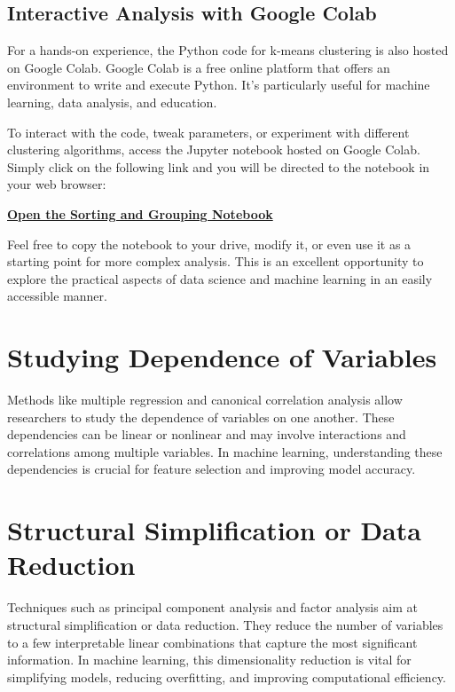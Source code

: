 \documentclass{book}
\begin{document}
\subsection{Interactive Analysis with Google Colab}
For a hands-on experience, the Python code for k-means clustering is also hosted on Google Colab. Google Colab is a free online platform that offers an environment to write and execute Python. It's particularly useful for machine learning, data analysis, and education.

To interact with the code, tweak parameters, or experiment with different clustering algorithms, access the Jupyter notebook hosted on Google Colab. Simply click on the following link and you will be directed to the notebook in your web browser:

\begin{center}
\href{https://colab.research.google.com/drive/1C4Rnja-fjwVB6GI5h1vYItJ5fbxDHlxh}{\textbf{Open the Sorting and Grouping Notebook}}
\end{center}

Feel free to copy the notebook to your drive, modify it, or even use it as a starting point for more complex analysis. This is an excellent opportunity to explore the practical aspects of data science and machine learning in an easily accessible manner.

\section{Studying Dependence of Variables}
Methods like multiple regression and canonical correlation analysis allow researchers to study the dependence of variables on one another. These dependencies can be linear or nonlinear and may involve interactions and correlations among multiple variables. In machine learning, understanding these dependencies is crucial for feature selection and improving model accuracy.

\section{Structural Simplification or Data Reduction}
Techniques such as principal component analysis and factor analysis aim at structural simplification or data reduction. They reduce the number of variables to a few interpretable linear combinations that capture the most significant information. In machine learning, this dimensionality reduction is vital for simplifying models, reducing overfitting, and improving computational efficiency.
\end{document}
